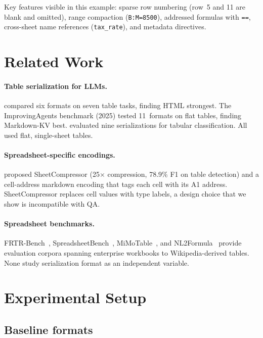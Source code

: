 \documentclass[11pt]{article}
\begin{document}
Key features visible in this example: sparse row numbering (row~5 and 11 are blank and omitted), range compaction (\texttt{B:M=8500}), addressed formulas with \texttt{==}, cross-sheet name references (\texttt{tax\_rate}), and metadata directives.

\section{Related Work}
\label{sec:related}

\paragraph{Table serialization for LLMs.}
\citet{sui2024table} compared six formats on seven table tasks, finding HTML strongest.
The ImprovingAgents benchmark (2025) tested 11~formats on flat tables, finding Markdown-KV best.
\citet{hegselmann2023tabllm} evaluated nine serializations for tabular classification.
All used flat, single-sheet tables.

\paragraph{Spreadsheet-specific encodings.}
\citet{dong2024spreadsheetllm} proposed SheetCompressor (25$\times$ compression, 78.9\% F1 on table detection) and a cell-address markdown encoding that tags each cell with its A1 address.
SheetCompressor replaces cell values with type labels, a design choice that we show is incompatible with QA.

\paragraph{Spreadsheet benchmarks.}
FRTR-Bench~\citep{gulati2025frtr}, SpreadsheetBench~\citep{ma2024spreadsheetbench}, MiMoTable~\citep{li2024mimotable}, and NL2Formula~\citep{zhao2024nl2formula} provide evaluation corpora spanning enterprise workbooks to Wikipedia-derived tables.
None study serialization format as an independent variable.

\section{Experimental Setup}
\label{sec:setup}

\subsection{Baseline formats}
\end{document}

